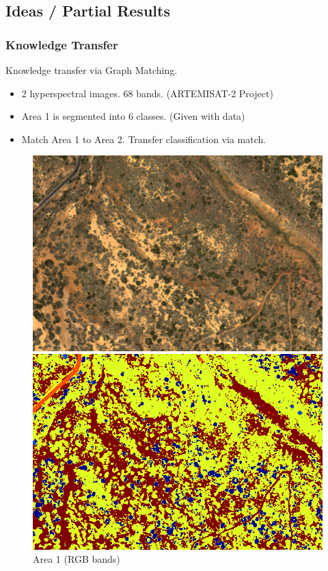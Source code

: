 \documentclass{beamer}
\begin{document}
\subsection{Ideas / Partial Results}
\begin{frame}
  \frametitle{Knowledge Transfer}
  Knowledge transfer via Graph Matching.
  \begin{itemize}
  \item 2 hyperspectral images. 68 bands. (ARTEMISAT-2 Project)
  \item Area 1 is segmented into 6 classes. (Given with data)
  \item Match Area 1 to Area 2. Transfer classification via match.
  \end{itemize}
  \begin{figure}[ht]
    \centering
    \begin{minipage}[b]{0.30\linewidth}
      \centering
      \includegraphics[width=\textwidth]{./Images/EdurneAreas/Area2.png}
      \caption{Area 1 (RGB bands)}
    \end{minipage}
    \hfill
    \begin{minipage}[b]{0.30\linewidth}
      \centering
      \includegraphics[width=\textwidth]{./Images/EdurneAreas/Area2OriginalClassification.png}

\end{minipage}
\end{figure}
\end{frame}
\end{document}
